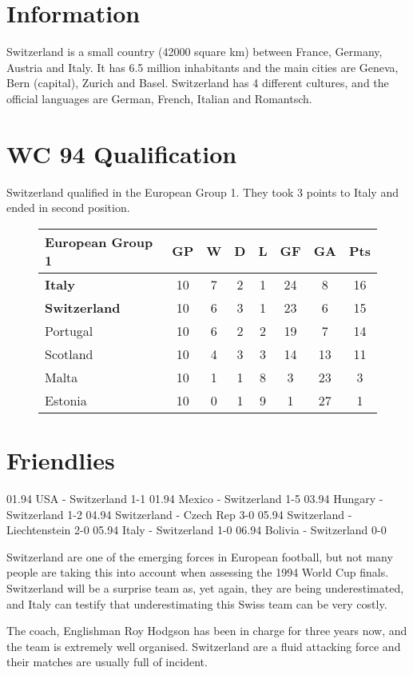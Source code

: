 \section{Information}
Switzerland is a small country (42000 square km) between France, Germany, 
Austria and Italy. It has 6.5 million inhabitants and the main cities are 
Geneva, Bern (capital), Zurich and Basel.
Switzerland has 4 different cultures, and the official languages are German, 
French, Italian and Romantsch.

\section{WC 94 Qualification}
Switzerland qualified in the European Group 1. They took 3 points to Italy and ended in second position.
\begin{figure}[H]
\begin{tabular}{l c c c c c c c}
European Group 1 & GP & W & D & L & GF & GA & Pts \\ \hline
\textbf{Italy} & 10 & 7 & 2 & 1 & 24 & 8 & 16 \\
\textbf{Switzerland} & 10 & 6 & 3 & 1 & 23 & 6 & 15 \\
Portugal & 10 & 6 & 2 & 2 & 19 & 7 & 14 \\
Scotland & 10 & 4 & 3 & 3 & 14 & 13 & 11 \\
Malta & 10 & 1 & 1 & 8 & 3 & 23 & 3 \\
Estonia & 10 & 0 & 1 & 9 & 1 & 27 & 1 \\ \hline
\end{tabular}
\end{figure}
\section{Friendlies}

01.94   USA - Switzerland 1-1
01.94   Mexico - Switzerland 1-5
03.94   Hungary - Switzerland   1-2
04.94   Switzerland - Czech Rep 3-0
05.94   Switzerland - Liechtenstein 2-0
05.94   Italy - Switzerland   1-0
06.94   Bolivia - Switzerland   0-0

Switzerland are one of the emerging forces in European football, but not many 
people are taking this into account when assessing the 1994 World Cup finals.
Switzerland will be a surprise team as, yet again, they are being 
underestimated, and Italy can testify that underestimating this Swiss team can
be very costly.

The coach, Englishman Roy Hodgson has been in charge for three years now, and
the team is extremely well organised. Switzerland are a fluid attacking force
and their matches are usually full of incident.

